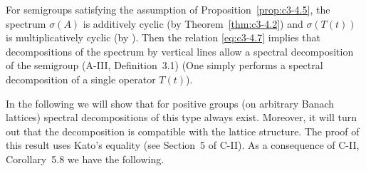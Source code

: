 For semigroups satisfying the assumption of Proposition~\ref{prop:c3-4.5}, the spectrum $\sigma(A)$ is additively cyclic (by Theorem~\ref{thm:c3-4.2}) and $\sigma(T(t))$ is multiplicatively cyclic
(by \citet[V.Theorem~4.4]{schaefer:1974}). 
Then the relation \eqref{eq:c3-4.7} implies that
decompositions of the spectrum by vertical lines allow a spectral
decomposition of the semigroup (\cf A-III, Definition~3.1) (One simply performs a spectral decomposition of a single operator $T(t)$). 

In the
following we will show that for positive groups (on arbitrary Banach
lattices) spectral decompositions of this type always exist. Moreover,
it will turn out that the decomposition is compatible with the lattice
structure. The proof of this result uses Kato's equality (see Section~5 of
C-II). As a consequence of C-II, Corollary~5.8 we have the following.

